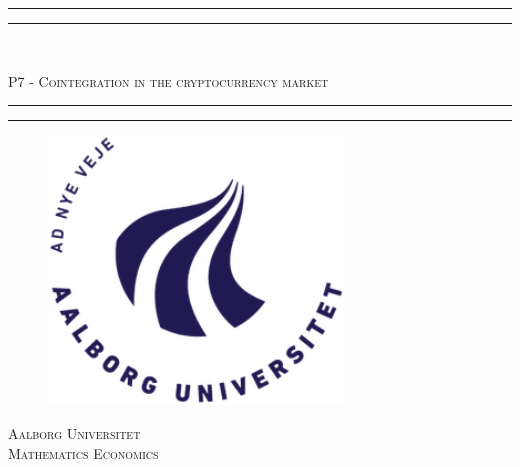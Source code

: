 \begin{flushright}


\phantom{hul}


\end{flushright}


\thispagestyle{empty} 
\noindent \rule{\textwidth}{1.6pt}\vspace*{-\baselineskip}\vspace*{2pt} %
\rule{\textwidth}{0.4pt}\
\begin{center} \LARGE \textsc{P7 - Cointegration in the cryptocurrency market} \\
\end{center}
\rule{\textwidth}{0.4pt}\vspace*{-\baselineskip}\vspace{3.2pt} %
\rule{\textwidth}{1.6pt} %
\vspace{2cm}

\begin{figure}[H]
\centering
\includegraphics[width=0.70\textwidth]{1 Formalities/Billeder/AAU_logo_2012.png}
\end{figure}

\vfill
\begin{center}
\textsc{Aalborg Universitet} \\
\textsc{Mathematics Economics} \\
\end{center}

\null
\pagebreak
